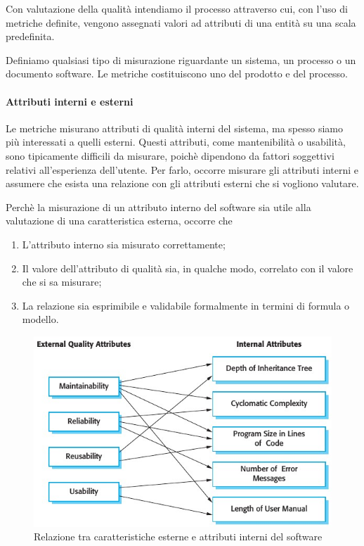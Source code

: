 Con valutazione della qualità intendiamo il processo attraverso cui, con l'uso
di metriche definite, vengono assegnati valori ad attributi di una entità su una
scala predefinita.

Definiamo  qualsiasi tipo di misurazione riguardante un sistema,
un processo o un documento software. Le metriche costituiscono uno
 del prodotto e del processo.

\paragraph{Attributi interni e esterni}

Le metriche misurano attributi di qualità interni del sistema, ma spesso siamo
più interessati a quelli esterni. Questi attributi, come mantenibilità o
usabilità, sono tipicamente difficili da misurare, poichè dipendono da fattori
soggettivi relativi all'esperienza dell'utente. Per farlo, occorre misurare gli
attributi interni e assumere che esista una relazione con gli attributi esterni
che si vogliono valutare.

Perchè la misurazione di un attributo interno del software sia utile alla
valutazione di una caratteristica esterna, occorre che

\begin{enumerate}
  \item L'attributo interno sia misurato correttamente;
  \item Il valore dell'attributo di qualità sia, in qualche modo, correlato con
    il valore che si sa misurare;
  \item La relazione sia esprimibile e validabile formalmente in termini di
    formula o modello.
\end{enumerate}

\begin{figure}[h]
  \centering
  \includegraphics[scale=0.6]{imgs/int_ext_attrib.jpg}
  \caption{Relazione tra caratteristiche esterne e attributi interni del
    software}
\end{figure}

